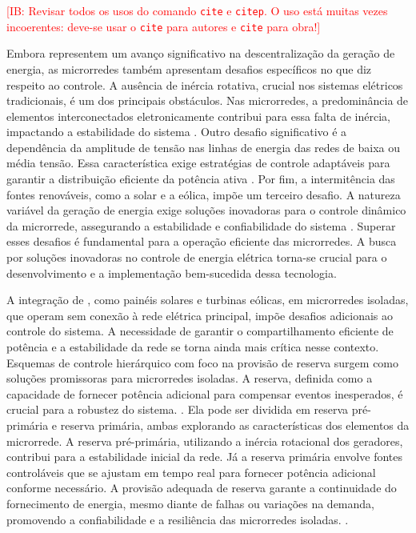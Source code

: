 \textcolor{red}{[IB: Revisar todos os usos do comando \texttt{cite} e \texttt{citep}. O uso está muitas vezes incoerentes: deve-se usar o \texttt{cite} para autores e \texttt{cite} para obra!]}

Embora representem um avanço significativo na descentralização da geração de energia, as microrredes também apresentam desafios específicos no que diz respeito ao controle. A ausência de inércia rotativa, crucial nos sistemas elétricos tradicionais, é um dos principais obstáculos. Nas microrredes, a predominância de elementos interconectados eletronicamente contribui para essa falta de inércia, impactando a estabilidade do sistema \cite{Paigi2013}. Outro desafio significativo é a dependência da amplitude de tensão nas linhas de energia das redes de baixa ou média tensão. Essa característica exige estratégias de controle adaptáveis para garantir a distribuição eficiente da potência ativa \citep{Paigi2013}. Por fim, a intermitência das fontes renováveis, como a solar e a eólica, impõe um terceiro desafio. A natureza variável da geração de energia exige soluções inovadoras para o controle dinâmico da microrrede, assegurando a estabilidade e confiabilidade do sistema \citep{Paigi2013}. Superar esses desafios é fundamental para a operação eficiente das microrredes. A busca por soluções inovadoras no controle de energia elétrica torna-se crucial para o desenvolvimento e a implementação bem-sucedida dessa tecnologia.

A integração de , como painéis solares e turbinas eólicas, em microrredes isoladas, que operam sem conexão à rede elétrica principal, impõe desafios adicionais ao controle do sistema. A necessidade de garantir o compartilhamento eficiente de potência e a estabilidade da rede se torna ainda mais crítica nesse contexto. Esquemas de controle hierárquico com foco na provisão de reserva surgem como soluções promissoras para microrredes isoladas. A reserva, definida como a capacidade de fornecer potência adicional para compensar eventos inesperados, é crucial para a robustez do sistema.  \cite{Paigi2013}. Ela pode ser dividida em reserva pré-primária e reserva primária, ambas explorando as características dos elementos da microrrede. A reserva pré-primária, utilizando a inércia rotacional dos geradores, contribui para a estabilidade inicial da rede. Já a reserva primária envolve fontes controláveis que se ajustam em tempo real para fornecer potência adicional conforme necessário. A provisão adequada de reserva garante a continuidade do fornecimento de energia, mesmo diante de falhas ou variações na demanda, promovendo a confiabilidade e a resiliência das microrredes isoladas. \cite{Paigi2013}.

